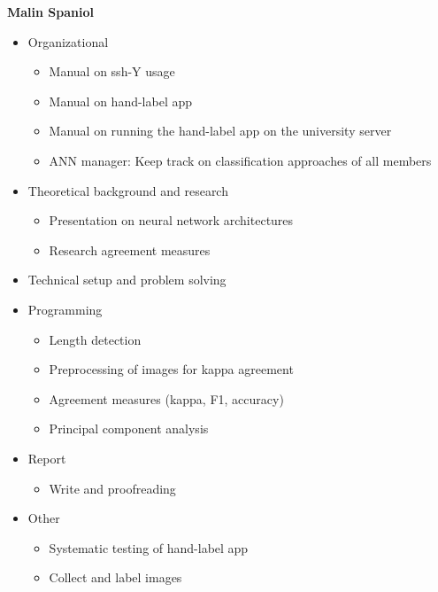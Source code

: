 \bigskip
\textbf{Malin Spaniol}
\begin{itemize}
	\item Organizational
	\begin{itemize}
		\item Manual on ssh-Y usage
		\item Manual on hand-label app
		\item Manual on running the hand-label app on the university server
		\item ANN manager: Keep track on classification approaches of all members
	\end{itemize}
	\item Theoretical background and research
	\begin{itemize}
		\item Presentation on neural network architectures
		\item Research agreement measures
	\end{itemize}
	\item Technical setup and problem solving
	\item Programming
	\begin{itemize}
		\item Length detection
		\item Preprocessing of images for kappa agreement
		\item Agreement measures (kappa, F1, accuracy)
		\item Principal component analysis
	\end{itemize} 
	\item Report
	\begin{itemize}
		\item Write and proofreading
	\end{itemize}
	\item Other
	\begin{itemize}
		\item Systematic testing of hand-label app
		\item Collect and label images
	\end{itemize}
\end{itemize}

